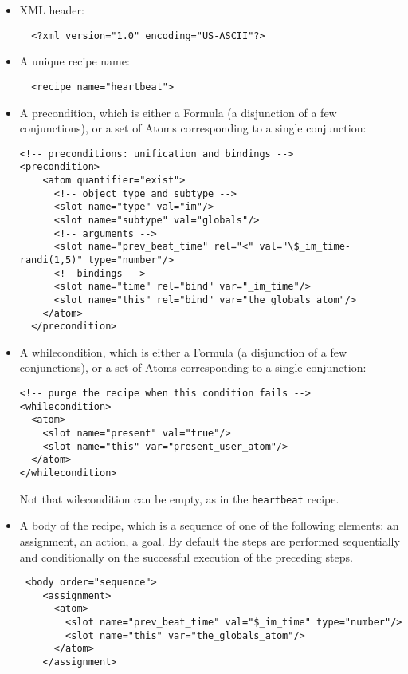 \begin{itemize}
\item XML header: 
\begin{lstlisting}
  <?xml version="1.0" encoding="US-ASCII"?>
\end{lstlisting}

\item A unique recipe name: 
\lstset{language=XML}
\begin{lstlisting}
  <recipe name="heartbeat">
\end{lstlisting}

\item A precondition, which is either a Formula (a disjunction of a few conjunctions), or a set of Atoms corresponding to a single conjunction:
\lstset{language=XML}
\begin{lstlisting}
<!-- preconditions: unification and bindings -->
<precondition>
    <atom quantifier="exist">
      <!-- object type and subtype -->
      <slot name="type" val="im"/>
      <slot name="subtype" val="globals"/>
      <!-- arguments -->
      <slot name="prev_beat_time" rel="<" val="\$_im_time-randi(1,5)" type="number"/>
      <!--bindings -->
      <slot name="time" rel="bind" var="_im_time"/>
      <slot name="this" rel="bind" var="the_globals_atom"/>
    </atom>
  </precondition>
\end{lstlisting}

\item A whilecondition, which is either a Formula (a disjunction of a few conjunctions), or a set of Atoms corresponding to a single conjunction:

\lstset{language=XML}
\begin{lstlisting}
<!-- purge the recipe when this condition fails -->
<whilecondition>
  <atom>
    <slot name="present" val="true"/>
    <slot name="this" var="present_user_atom"/>
  </atom>
</whilecondition>
\end{lstlisting}

Not that wilecondition can be empty, as in the \texttt{heartbeat} recipe.

\item A body of the recipe, which is a sequence of one of the following elements: an assignment, an action, a goal. By default the steps are performed sequentially and conditionally on the successful execution of the preceding steps. 

\lstset{language=XML}
\begin{lstlisting}
 <body order="sequence">
    <assignment>
      <atom>
        <slot name="prev_beat_time" val="$_im_time" type="number"/>
        <slot name="this" var="the_globals_atom"/>
      </atom>
    </assignment>


\end{lstlisting}
\end{itemize}
